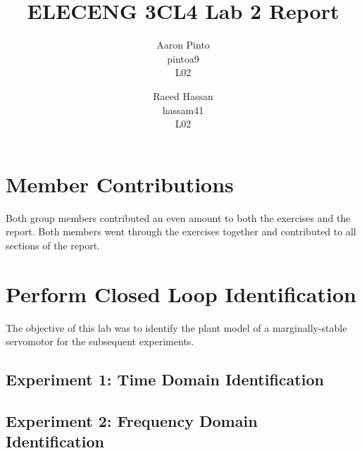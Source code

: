 \documentclass[12pt]{article}
\title{ELECENG 3CL4 Lab 2 Report}
\author{
    Aaron Pinto \\
    pintoa9 \\
    L02
    \and
    Raeed Hassan \\
    hassam41 \\
    L02
}
\begin{document}
\maketitle
\clearpage

\setcounter{section}{2}
\section{Member Contributions}
Both group members contributed an even amount to both the exercises and the report. Both members went through the exercises together and contributed to all sections of the report.

\section{Perform Closed Loop Identification}
The objective of this lab was to identify the plant model of a marginally-stable servomotor for the subsequent experiments.

\subsection{Experiment 1: Time Domain Identification}

\subsection{Experiment 2: Frequency Domain Identification}
\end{document}
